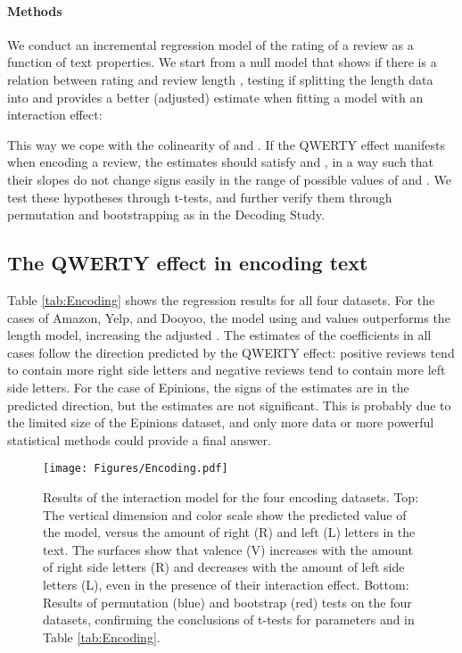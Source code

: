 \documentclass[letterpaper]{sig-alternate-2013}
\begin{document}
\paragraph{Methods}

We conduct an incremental regression model of  the rating of a review  as a
function of text properties. We start from a null model that shows if there is
a relation between rating and review length  , testing if
splitting the length data into  and  provides a better (adjusted)
estimate  when fitting a model with an interaction effect:

This way we cope with the colinearity of  and .  If the QWERTY effect
manifests when encoding a review, the estimates should satisfy  and
, in a way such that their slopes do not change signs easily in the
range of possible values of  and . We test these hypotheses through
t-tests, and further verify them through permutation and bootstrapping as in
the Decoding Study.


\subsection{The QWERTY effect in encoding text}


Table \ref{tab:Encoding} shows the regression results for all four datasets.
For the cases of Amazon, Yelp, and Dooyoo, the model using  and  values
outperforms the length model, increasing the adjusted . The estimates of
the coefficients in all cases follow the direction predicted by the QWERTY
effect: positive reviews tend to contain more right side letters and negative
reviews tend to contain more left side letters.  For the case of Epinions, the
signs of the estimates are in the predicted direction, but the estimates are
not significant. This is probably due to the limited size of the Epinions
dataset, and only more data or more powerful statistical methods could provide
a final answer.


\begin{figure*}[ht] \centering
\texttt{[image: Figures/Encoding.pdf]}\\
\caption{Results of the interaction model for the four encoding datasets. Top:
The vertical dimension and color scale show the predicted value of the model,
versus the amount of right (R) and left (L) letters in the text. The surfaces
show that valence (V) increases with  the amount of right side letters (R) and
decreases with the amount of left side letters (L), even in the presence of
their interaction effect. Bottom: Results of permutation (blue) and bootstrap
(red) tests on the four datasets, confirming the conclusions of t-tests for parameters  and  in
Table \ref{tab:Encoding}. \label{fig:Encoding}} \end{figure*}
\end{document}
